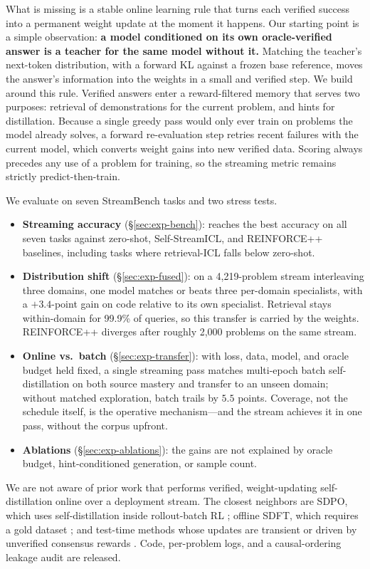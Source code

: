 What is missing is a stable online learning rule that turns each verified
success into a permanent weight update at the moment it happens. Our starting
point is a simple observation: \textbf{a model conditioned on its own
oracle-verified answer is a teacher for the same model without it.} Matching
the teacher's next-token distribution, with a forward KL against a frozen base
reference, moves the answer's information into the weights in a small and
verified step. We build \method{} around this rule. Verified answers enter a
reward-filtered memory \citep{wu2024streambench} that serves two purposes:
retrieval of demonstrations for the current problem, and hints for
distillation. Because a single greedy pass would only ever train on problems
the model already solves, a forward re-evaluation step retries recent failures
with the current model, which converts weight gains into new verified data.
Scoring always precedes any use of a problem for training, so the streaming
metric remains strictly predict-then-train.

We evaluate on seven StreamBench tasks and two stress tests.
\begin{itemize}
\item \textbf{Streaming accuracy} (\S\ref{sec:exp-bench}): \method{} reaches
  the best accuracy on all seven tasks against zero-shot, Self-StreamICL, and
  REINFORCE++ baselines, including tasks where retrieval-ICL falls below
  zero-shot.
\item \textbf{Distribution shift} (\S\ref{sec:exp-fused}): on a 4{,}219-problem
  stream interleaving three domains, one \method{} model matches or beats three
  per-domain specialists, with a $+3.4$-point gain on code relative to its own
  specialist. Retrieval stays within-domain for 99.9\% of queries, so this
  transfer is carried by the weights. REINFORCE++ diverges after roughly
  2{,}000 problems on the same stream.
\item \textbf{Online vs.\ batch} (\S\ref{sec:exp-transfer}): with loss, data,
  model, and oracle budget held fixed, a single streaming pass matches
  multi-epoch batch self-distillation on both source mastery and transfer to
  an unseen domain; without matched exploration, batch trails by $5.5$
  points. Coverage, not the schedule itself, is the operative mechanism---and
  the stream achieves it in one pass, without the corpus upfront.
\item \textbf{Ablations} (\S\ref{sec:exp-ablations}): the gains are not
  explained by oracle budget, hint-conditioned generation, or sample count.
\end{itemize}
We are not aware of prior work that performs verified, weight-updating
self-distillation online over a deployment stream. The closest neighbors are
SDPO, which uses self-distillation inside rollout-batch RL \citep{hue2026sdpo};
offline SDFT, which requires a gold dataset \citep{yang2024selfdistillation};
and test-time methods whose updates are transient \citep{akyurek2025surprising}
or driven by unverified consensus rewards \citep{zuo2025ttrl}. Code,
per-problem logs, and a causal-ordering leakage audit are released.
